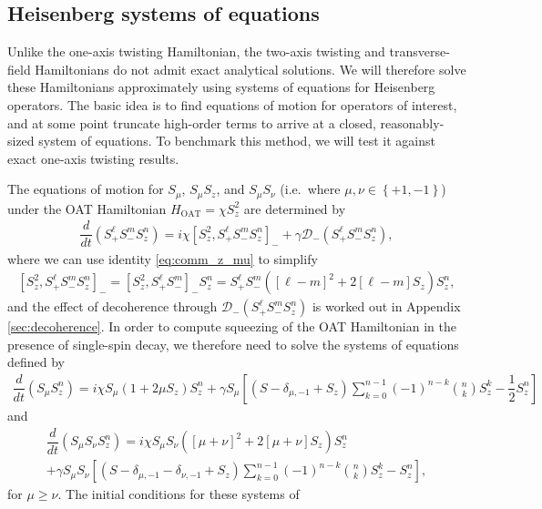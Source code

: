 \documentclass[aps,notitlepage,nofootinbib,11pt]{revtex4-1}
\renewcommand{\t}{\text} %
\newcommand{\f}[2]{\dfrac{#1}{#2}} %
\newcommand{\p}[1]{\left(#1\right)} %
\renewcommand{\sp}[1]{\left[#1\right]} %
\renewcommand{\set}[1]{\left\{#1\right\}} %
\newcommand{\D}{\mathcal{D}}
\newcommand{\1}{\mathds{1}}
\begin{document}
\subsection{Heisenberg systems of equations}

Unlike the one-axis twisting Hamiltonian, the two-axis twisting and
transverse-field Hamiltonians do not admit exact analytical
solutions. We will therefore solve these Hamiltonians approximately
using systems of equations for Heisenberg operators.  The basic idea
is to find equations of motion for operators of interest, and at some
point truncate high-order terms to arrive at a closed,
reasonably-sized system of equations.  To benchmark this method, we
will test it against exact one-axis twisting results.

The equations of motion for $S_\mu$, $S_\mu S_z$, and $S_\mu S_\nu$
(i.e.~where $\mu,\nu\in\set{+1,-1}$) under the OAT Hamiltonian
$H_{\t{OAT}}=\chi S_z^2$ are determined by
\begin{align}
  \f{d}{dt} \p{S_+^\ell S_-^m S_z^n}
  = i\chi \sp{S_z^2, S_+^\ell S_-^m S_z^n}_-
  + \gamma \D_-\p{S_+^\ell S_-^m S_z^n},
\end{align}
where we can use identity \eqref{eq:comm_z_mu} to simplify
\begin{align}
  \sp{S_z^2, S_+^\ell S_-^m S_z^n}_-
  = \sp{S_z^2, S_+^\ell S_-^m}_- S_z^n
  = S_+^\ell S_-^m \p{\sp{\ell-m}^2 + 2\sp{\ell-m} S_z} S_z^n,
  \label{eq:S_z^2_comm}
\end{align}
and the effect of decoherence through $\D_-\p{S_+^\ell S_-^m S_z^n}$ is
worked out in Appendix \ref{sec:decoherence}.  In order to compute
squeezing of the OAT Hamiltonian in the presence of single-spin decay,
we therefore need to solve the systems of equations defined by
\begin{align}
  \f{d}{dt} \p{S_\mu S_z^n}
  = i\chi S_\mu \p{1 + 2\mu S_z} S_z^n
  + \gamma S_\mu \sp{\p{S - \delta_{\mu,-1} + S_z} \sum_{k=0}^{n-1}
    \p{-1}^{n-k} { n \choose k } S_z^k - \f12 S_z^n}
  \label{eq:evolution_OAT_single}
\end{align}
and
\begin{multline}
  \f{d}{dt} \p{S_\mu S_\nu S_z^n}
  = i\chi S_\mu S_\nu \p{\sp{\mu+\nu}^2 + 2 \sp{\mu+\nu} S_z} S_z^n \\
  + \gamma S_\mu S_\nu
  \sp{\p{S - \delta_{\mu,-1} - \delta_{\nu,-1} + S_z} \sum_{k=0}^{n-1}
    \p{-1}^{n-k} { n \choose k } S_z^k - S_z^n},
  \label{eq:evolution_OAT_pair}
\end{multline}
for $\mu\ge\nu$.  The initial conditions for these systems of
\end{document}
